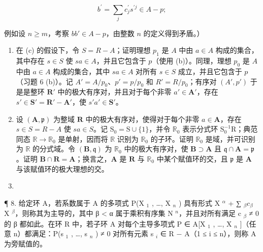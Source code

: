 \[
b ^ {\prime} = \sum_ {j} c _ {j} ^ {\prime} s ^ {\prime j} \in A - p;
\]

  例如设 \(n \geqslant m\)，考察 \(bb' \in A - p\)，由整数 \(n\) 的定义得到矛盾。）

\begin{enumerate}
\def\labelenumi{(\alph{enumi})}
\setcounter{enumi}{3}
\item
  在 (c) 的假设下，令 \(S = R - A\)；证明理想 \(p_1\) 是 \(A\) 中由 \(a \in A\) 构成的集合，其中存在 \(s \in S\) 使 \(sa \in A\)，并且它包含于 \(p\)（使用 (b)）。同理，理想 \(p_0\) 是 \(A\) 中由 \(a \in A\) 构成的集合，其中 \(sa \in A\) 对所有 \(s \in S\) 成立，并且它包含于 \(p\)（习题 6 (b)）。记 \(A' = A / p_0\)、\(p' = p / p_0\) 和 \(R' = R / p_0\)；有序对 \((A', p')\) 于是是整环 \(\mathbf{R}'\) 中的极大有序对，并且对于每个非零 \(a' \in \mathbf{A}'\)，存在 \(s' \in \mathbf{S}' = \mathbf{R}' - \mathbf{A}'\)，使 \(s'a' \in \mathbf{S}'\)。
\item
  设 \((\mathbf{A},\mathfrak{p})\) 为整域 \(\mathbf{R}\) 中的极大有序对，使得对于每个非零 \(a\in \mathbf{A}\)，存在 \(s\in S = R - A\) 使 \(sa\in S\)。记 \(\mathrm{S}_0 = \mathrm{S}\cup \{1\}\)，并令 \(\mathbb{R}_0\) 表示分式环 \(\mathrm{S}_0^{-1}\mathrm{R}\)；典范同态 \(\mathbb{R}\to \mathbb{R}_0\) 是单射，因而将 \(\mathbb{R}\) 识别为 \(\mathbb{R}_0\) 的子环。证明 \(\mathbb{R}_0\) 是域，并可识别为 \(\mathbb{R}\) 的分式域。令 \((\mathbf{B},\mathfrak{q})\) 为 \(\mathbb{R}_0\) 中的极大有序对，使 \(\mathbf{B}\supset \mathbf{A}\) 且 \(\mathfrak{q}\cap \mathbf{A} = \mathfrak{p}\)。证明 \(\mathbf{B}\cap \mathbf{R} = \mathbf{A}\)；换言之，\(\mathbf{A}\) 是 \(\mathbf{R}\) 与 \(\mathbb{R}_0\) 中某个赋值环的交，且 \(\mathfrak{p}\) 是 \(\mathbf{A}\) 与该赋值环的极大理想的交。
\item
\end{enumerate}

¶ 8. 给定环 A，若系数属于 A 的多项式 P(X \(_{1}\) , \ldots, X \(_{n}\) ) 具有形式 X \(^{\alpha}\) + ∑ \(_{\beta} c_{\beta}\) X \(^{\beta}\)，则称其为主导的，其中 β \textless{} α 属于乘积有序集 N \(^{n}\)，并且对所有满足 c \(_{\beta}\) ≠ 0 的 β 都如此。在环 R 中，若子环 A 对每个主导多项式 P ∈ A{[}X \(_{1}\) , \ldots, X \(_{n}\) {]}（任意 n）都满足：P(s \(_{1}\) , \ldots, s \(_{n}\) ) ≠ 0 对所有元素 s \(_{i}\) ∈ R − A（1 ≤ i ≤ n），则称 A 为旁赋值的。

